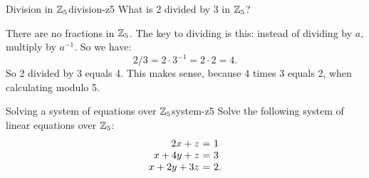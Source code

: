 \begin{example}{Division in $\mathbb{Z}_5$}{division-z5}
  What is 2 divided by 3 in $\mathbb{Z}_5$?
\end{example}

\begin{solution}
  There are no fractions in $\mathbb{Z}_5$. The key to dividing is
  this: instead of dividing by $a$, multiply by $a^{-1}$. So we have:
  \begin{equation*}
    2/3 = 2\cdot 3^{-1} = 2\cdot 2 = 4.
  \end{equation*}
  So 2 divided by 3 equals 4. This makes sense, because 4 times 3
  equals 2, when calculating modulo 5.
\end{solution}

\begin{example}{Solving a system of equations over $\mathbb{Z}_5$}{system-z5}
  Solve the following system of linear equations over $\mathbb{Z}_5$:
  \begin{equation*}
    \begin{array}{r@{~}c@{~}l}
      2x + z &=& 1 \\
      x+4y+z &=& 3 \\
      x+2y+3z &=& 2. \\
    \end{array}
  \end{equation*}
\end{example}

